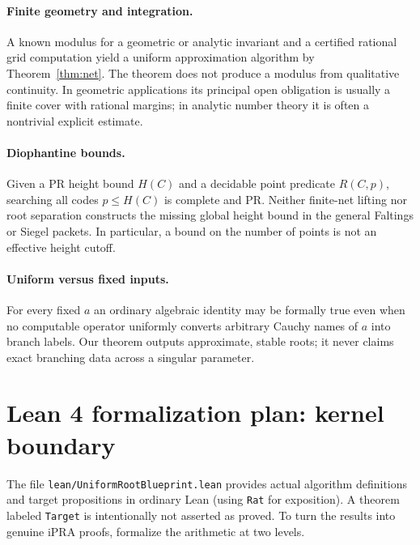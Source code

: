 \documentclass[11pt]{article}
\begin{document}
\paragraph{Finite geometry and integration.} A known modulus for a geometric or analytic invariant and a certified rational grid computation yield a uniform approximation algorithm by Theorem~\ref{thm:net}. The theorem does not produce a modulus from qualitative continuity. In geometric applications its principal open obligation is usually a finite cover with rational margins; in analytic number theory it is often a nontrivial explicit estimate.

\paragraph{Diophantine bounds.} Given a PR height bound $H(C)$ and a decidable point predicate $R(C,p)$, searching all codes $p\le H(C)$ is complete and PR. Neither finite-net lifting nor root separation constructs the missing global height bound in the general Faltings or Siegel packets. In particular, a bound on the number of points is not an effective height cutoff.

\paragraph{Uniform versus fixed inputs.} For every fixed $a$ an ordinary algebraic identity may be formally true even when no computable operator uniformly converts arbitrary Cauchy names of $a$ into branch labels. Our theorem outputs approximate, stable roots; it never claims exact branching data across a singular parameter.

\section{Lean 4 formalization plan: kernel boundary}
The file \texttt{lean/UniformRootBlueprint.lean} provides actual algorithm definitions and target propositions in ordinary Lean (using \texttt{Rat} for exposition). A theorem labeled \texttt{Target} is intentionally not asserted as proved. To turn the results into genuine iPRA proofs, formalize the arithmetic at two levels.
\end{document}
